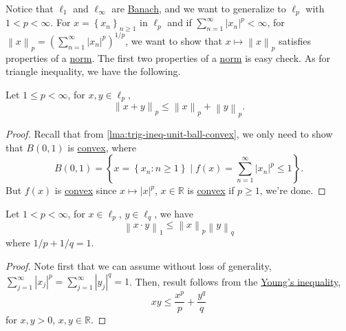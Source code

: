 Notice that \(\ell _1\) and \(\ell _\infty \) are \hyperref[def:Banach-space]{Banach}, and we want to generalize to \(\ell _p\) with \(1 < p < \infty \). For \(x = \left\{ x_n \right\}_{n\geq 1}\) in \(\ell _p\) and if \(\sum_{n=1}^{\infty} \left\vert x_n \right\vert ^p < \infty \), for \(\left\lVert x\right\rVert _p = \left( \sum_{n=1}^{\infty} \left\vert x_n \right\vert ^p \right)^{1 / p}\), we want to show that \(x \mapsto \left\lVert x\right\rVert _p\) satisfies properties of a \hyperref[def:norm]{norm}. The first two properties of a \hyperref[def:norm]{norm} is easy check. As for triangle inequality, we have the following.

\begin{lemma}\label{lma:Minkowski-ineq}
	Let \(1 \leq p < \infty \), for \(x, y\in \ell _p\),
	\[
		\left\lVert x + y\right\rVert _p \leq \left\lVert x\right\rVert _p + \left\lVert y\right\rVert _p.
	\]
\end{lemma}
\begin{proof}
	Recall that from \autoref{lma:trig-ineq-unit-ball-convex}, we only need to show that \(B(0, 1)\) is \hyperref[def:convex-function]{convex}, where
	\[
		B(0, 1) = \left\{ x = \left\{ x_n\colon n\geq 1 \right\}\mid f(x) = \sum_{n=1}^{\infty} \left\vert x_n \right\vert ^p\leq 1  \right\}.
	\]
	But \(f(x)\) is \hyperref[def:convex-function]{convex} since \(x\mapsto \left\vert x \right\vert ^p\), \(x\in \mathbb{R} \) is \hyperref[def:convex-set]{convex} if \(p\geq 1\), we're done.
\end{proof}

\begin{lemma}\label{lma:Holder-ineq}
	Let \(1<p<\infty \), for \(x\in \ell _p\), \(y\in \ell _q\), we have
	\[
		\left\lVert x\cdot y\right\rVert_1 \leq \left\lVert x\right\rVert _p \left\lVert y\right\rVert _q
	\]
	where \(1 / p + 1 / q = 1\).
\end{lemma}
\begin{proof}
	Note first that we can assume without loss of generality, \(\sum_{j=1}^{\infty} \left\vert x_{j}  \right\vert ^p = \sum_{j=1}^{\infty} \left\vert y_{j}  \right\vert ^{q} = 1\). Then, result follows from the \href{https://en.wikipedia.org/wiki/Young's_inequality_for_products}{Young's inequality},
	\[
		xy \leq \frac{x^p}{p} + \frac{y^q}{q}
	\]
	for \(x, y> 0\), \(x, y\in \mathbb{R} \).
\end{proof}

